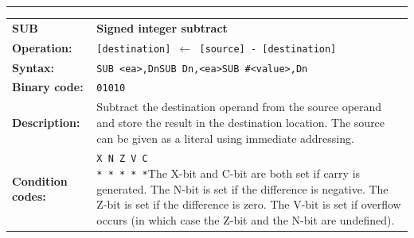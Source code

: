 \documentclass[]{article}
\begin{document}
\begin{appendices}
\noindent\rule{\textwidth}{1pt}\newline %
\setlength\extrarowheight{5pt} %
\begin{tabularx}{\textwidth}{lL}
  {\Large \textbf{SUB}} 	& {\Large \textbf{Signed integer subtract}}\\
  \textbf{Operation:} 		& \texttt{[destination] $\leftarrow$ [source] - [destination]}\\
  \textbf{Syntax:}  		& \texttt{SUB <ea>,Dn}\newline\texttt{SUB Dn,<ea>}\newline\texttt{SUB \#<value>,Dn}\\
  \textbf{Binary code:} 	& \texttt{01010}\\
  \textbf{Description:}  	& Subtract the destination operand from the source operand and store the
result in the destination location. The source can be given as a literal using immediate addressing.\\
  \textbf{Condition codes:} & \texttt{X N Z V C\newline * * * * *}\newline\newline The X-bit and C-bit are both set if carry is generated. The N-bit is set if the difference is negative. The Z-bit is set if the difference is zero. The V-bit is set if overflow occurs (in which case the Z-bit and the N-bit are undefined).\\
\end{tabularx}
\newline


\end{appendices}
\end{document}
